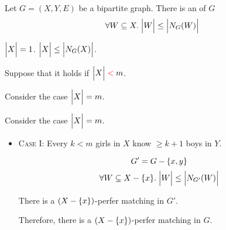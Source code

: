 \begin{frame}{}
  \begin{theorem}
    Let $G = (X, Y, E)$ be a bipartite graph.
    There is an  of $G$ 
    \[
      \forall W \subseteq X.\; \Big\lvert W \Big\rvert \le \Big\lvert N_{G}(W) \Big\rvert
    \]
  \end{theorem}
\end{frame}

\begin{frame}{}
  \begin{center}

    \pause
    \vspace{0.30cm}
    \begin{description}
      \setlength{\itemsep}{8pt}
      \item[Basis Step:] $\Big\lvert X \Big\rvert = 1$. $\Big\lvert X \Big\rvert \le \Big\lvert N_{G}(X) \Big\rvert$.
      \item[Induction Hypothesis:]
        Suppose that it holds if $\Big\lvert X \Big\rvert \;\textcolor{red}{<}\; m$.
      \item[Induction Step:]
        Consider the case $\Big\lvert X \Big\rvert = m$.
    \end{description}
  \end{center}
\end{frame}

\begin{frame}{}
  \begin{center}
    Consider the case $\Big\lvert X \Big\rvert = m$.

    \pause
    \vspace{0.50cm}
    \begin{itemize}
      \item \textsc{Case I:} Every $k < m$ girls in $X$ know
        $\ge k + 1$ boys in $Y$.

        \pause
        \vspace{0.20cm}
        \begin{center}
          \pause
          \[
            G' = G - \{x, y\}
          \]
          \pause
          \pause
          \[
            \forall W \subseteq X - \{x\}.\; \Big\lvert W \Big\rvert \le \Big\lvert N_{G'}(W) \Big\rvert
          \]

          \pause
          There is a $(X - \{x\})$-perfer matching in $G'$.

          \pause
          \vspace{0.30cm}
          Therefore, there is a $(X - \{x\})$-perfer matching in $G$.
        \end{center}
    \end{itemize}
  \end{center}
\end{frame}

